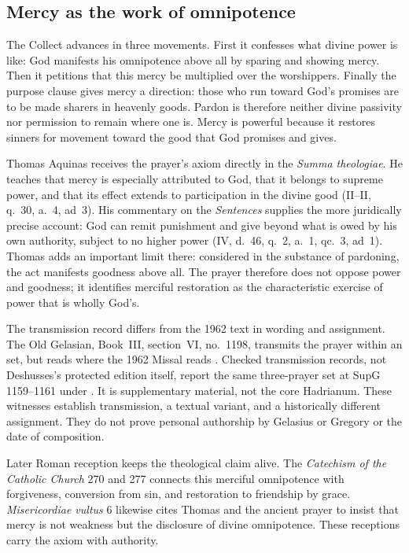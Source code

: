 \subsection*{Mercy as the work of omnipotence\enspace{}}

The Collect advances in three movements. First it confesses what divine power
is like: God manifests his omnipotence above all by sparing and showing mercy.
Then it petitions that this mercy be multiplied over the worshippers. Finally
the purpose clause gives mercy a direction: those who run toward God's
promises are to be made sharers in heavenly goods. Pardon is therefore neither
divine passivity nor permission to remain where one is. Mercy is powerful
because it restores sinners for movement toward the good that God promises
and gives.

Thomas Aquinas receives the prayer's axiom directly in the
\emph{Summa theologiae}. He teaches that mercy is especially attributed to
God, that it belongs to supreme power, and that its effect extends to
participation in the divine good (II--II, q.~30, a.~4, ad~3). His commentary
on the \emph{Sentences} supplies the more juridically precise account:
God can remit punishment and give beyond what is owed by his own authority,
subject to no higher power (IV, d.~46, q.~2, a.~1, qc.~3, ad~1). Thomas adds
an important limit there: considered in the substance of pardoning, the act
manifests goodness above all. The prayer therefore does not oppose power and
goodness; it identifies merciful restoration as the characteristic exercise
of power that is wholly God's.

The transmission record differs from the 1962 text in wording and assignment. The Old Gelasian,
Book~III, section~VI, no.~1198, transmits the prayer within an
 set, but reads  where the 1962 Missal
reads . Checked transmission records, not Deshusses's
protected edition itself, report the same three-prayer set at SupG 1159--1161
under . It is supplementary material,
not the core Hadrianum. These witnesses establish transmission, a textual
variant, and a historically different assignment. They do not prove personal
authorship by Gelasius or Gregory or the date of composition.

Later Roman reception keeps the theological claim alive. The \emph{Catechism of the Catholic Church} 270 and 277 connects this
merciful omnipotence with forgiveness, conversion from sin, and restoration
to friendship by grace. \emph{Misericordiae vultus} 6 likewise cites Thomas
and the ancient prayer to insist that mercy is not weakness but the disclosure
of divine omnipotence. These receptions carry the axiom with authority.
